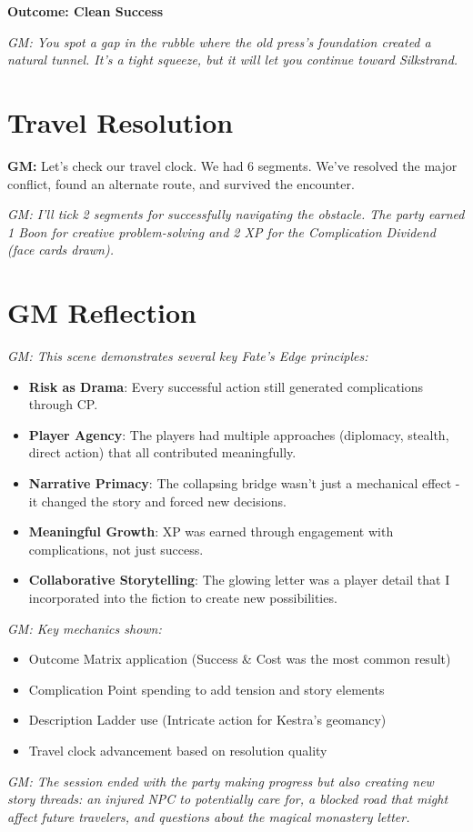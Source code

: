 \documentclass[11pt]{article}
\newcommand{\player}[1]{\textbf{#1:}}
\newcommand{\gm}[1]{\textit{GM: #1}}
\newcommand{\outcome}[1]{\textbf{Outcome: #1}}
\begin{document}
\outcome{Clean Success}

\gm{You spot a gap in the rubble where the old press's foundation created a natural tunnel. It's a tight squeeze, but it will let you continue toward Silkstrand.}

\section*{Travel Resolution}

\player{GM} Let's check our travel clock. We had 6 segments. We've resolved the major conflict, found an alternate route, and survived the encounter.

\gm{I'll tick 2 segments for successfully navigating the obstacle. The party earned 1 Boon for creative problem-solving and 2 XP for the Complication Dividend (face cards drawn).}

\section*{GM Reflection}

\gm{This scene demonstrates several key Fate's Edge principles:}

\begin{itemize}[leftmargin=*]
\item \textbf{Risk as Drama}: Every successful action still generated complications through CP.
\item \textbf{Player Agency}: The players had multiple approaches (diplomacy, stealth, direct action) that all contributed meaningfully.
\item \textbf{Narrative Primacy}: The collapsing bridge wasn't just a mechanical effect - it changed the story and forced new decisions.
\item \textbf{Meaningful Growth}: XP was earned through engagement with complications, not just success.
\item \textbf{Collaborative Storytelling}: The glowing letter was a player detail that I incorporated into the fiction to create new possibilities.
\end{itemize}

\gm{Key mechanics shown:}
\begin{itemize}[leftmargin=*]
\item Outcome Matrix application (Success \& Cost was the most common result)
\item Complication Point spending to add tension and story elements
\item Description Ladder use (Intricate action for Kestra's geomancy)
\item Travel clock advancement based on resolution quality
\end{itemize}

\gm{The session ended with the party making progress but also creating new story threads: an injured NPC to potentially care for, a blocked road that might affect future travelers, and questions about the magical monastery letter.}
\end{document}
